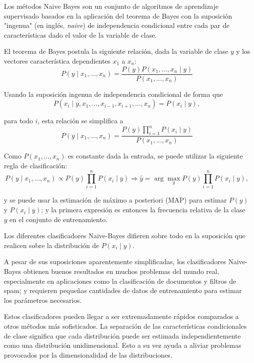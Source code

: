 Los métodos Naive Bayes son un conjunto de algoritmos de aprendizaje supervisado basados en la aplicación del teorema de Bayes con la suposición "ingenua" (en inglés, \emph{naive}) de independencia condicional entre cada par de características dado el valor de la variable de clase. 

El teorema de Bayes postula la siguiente relación, dada la variable de clase $y$ y los vectores característica dependientes $x_{1}$ a $x_{n}$:
\begin{equation*}
    P(y \mid x_{1},\dots,x_{n}) = \dfrac{P(y)P(x_{1},\dots,x_{n}\mid y)}{P(x_{1},\dots,x_{n})}
\end{equation*}

Usando la suposición ingenua de independencia condicional de forma que
\begin{equation*}
    P(x_{i} \mid y,x_{1},\dots,x_{i-1},x_{i+1},\dots,x_{n})=P(x_{i}\mid y),
\end{equation*}

para todo $i$, esta relación se simplifica a 
\begin{equation*}
    P(y\mid x_{1},\dots,x_{n})=\dfrac{P(y) \prod^{n}_{i=1} P(x_{i}\mid y)}{P(x_{1},\dots,x_{n})}
\end{equation*}

Como $P(x_{1},\dots,x_{n})$ es constante dada la entrada, se puede utilizar la siguiente regla de clasificación:
\begin{equation*}
    P(y\mid x_{1},\dots,x_{n}) \propto P(y) \prod^{n}_{i=1}P(x_{i}\mid y) \Rightarrow 
    \hat{y} = \arg \max_{y} P(y) \prod^{n}_{i=1}P(x_{i}\mid y),
\end{equation*}

y se puede usar la estimación de máximo a posteriori (MAP) para estimar $P(y)$ y $P(x_{i}\mid y)$; y la primera expresión es entonces la frecuencia relativa de la clase $y$ en el conjunto de entrenamiento.

Los diferentes clasificadores Naive-Bayes difieren sobre todo en la suposición que realicen sobre la distribución de $P(x_{i} \mid y)$.

A pesar de sus suposiciones aparentemente simplificadas, 
los clasificadores Naive-Bayes obtienen buenos resultados en muchos problemas del mundo real, 
especialmente en aplicaciones como la clasificación de documentos y filtros de spam;
y requieren pequeñas cantidades de datos de entrenamiento para estimar los parámetros necesarios.

Estos clasificadores pueden llegar a ser extremadamente rápidos comparados a otros métodos más sofisticados. La separación de las características condicionales de clase significa que cada distribución puede ser estimada independientemente como una distribución unidimensional.
Esto a su vez ayuda a aliviar problemas provocados por la dimensionalidad de las distribuciones.

